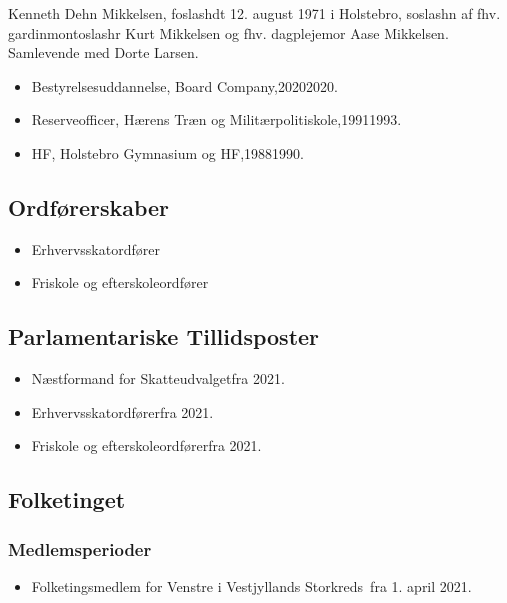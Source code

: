 \documentclass[11pt, a4paper]{awesome-cv}
\begin{document}
\makecvheader[R]
\makelettertitle
\begin{cvletter}
Kenneth Dehn Mikkelsen, foslashdt 12. august 1971 i Holstebro, soslashn af fhv. gardinmontoslashr Kurt Mikkelsen og fhv. dagplejemor Aase Mikkelsen. Samlevende med Dorte Larsen.

\begin{itemize}
\item Bestyrelsesuddannelse, Board Company,20202020.
\item Reserveofficer, Hærens Træn og Militærpolitiskole,19911993.
\item HF, Holstebro Gymnasium og HF,19881990.
\end{itemize}
\subsection*{Ordførerskaber}
\begin{itemize}
\item Erhvervsskatordfører
\item Friskole og efterskoleordfører
\end{itemize}
\subsection*{Parlamentariske Tillidsposter}
\begin{itemize}
\item Næstformand for Skatteudvalgetfra 2021.
\item Erhvervsskatordførerfra 2021.
\item Friskole og efterskoleordførerfra 2021.
\end{itemize}
\subsection*{Folketinget}
\subsubsection*{Medlemsperioder}
\begin{itemize}
\item Folketingsmedlem for Venstre i Vestjyllands Storkreds fra 1. april 2021.
\end{itemize}

\end{cvletter}
\end{document}
